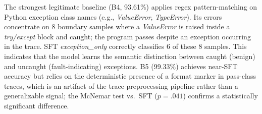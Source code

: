 \begin{table}[h!]
\centering
\caption{Regex baseline accuracy ($N{=}1{,}190$). B4 is the strongest semantic baseline (6.22pp below SFT \textit{exception\_only}, McNemar $p{<}.001$). B6 uses an error count threshold. $^\ddag$B5 exploits a data formatting artifact: the \textit{[No exception data in trace]} marker is deterministically present in all pass samples, making this a format-level shortcut rather than a genuine exception-based heuristic.}
\label{tab:regex}
\small
{}
\end{table}

The strongest legitimate baseline (B4, 93.61\%) applies regex pattern-matching on Python exception class names (e.g., \textit{ValueError}, \textit{TypeError}).
Its errors concentrate on 8 boundary samples where a \textit{ValueError} is raised inside a \textit{try/except} block and caught; the program passes despite an exception occurring in the trace.
SFT \textit{exception\_only} correctly classifies 6 of these 8 samples. This indicates that the model learns the semantic distinction between caught (benign) and uncaught (fault-indicating) exceptions.
B5 (99.33\%) achieves near-SFT accuracy but relies on the deterministic presence of a format marker in pass-class traces, which is an artifact of the trace preprocessing pipeline rather than a generalizable signal; the McNemar test vs.\ SFT ($p{=}.041$) confirms a statistically significant difference.

